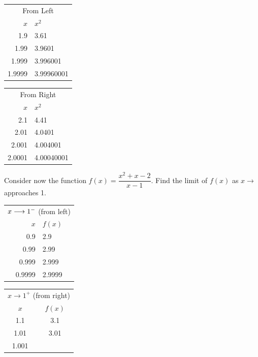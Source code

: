 \documentclass[11pt,a4paper]{article}
\begin{document}
\begin{table}[H]
\centering
\begin{tabular}{rl}
\multicolumn{2}{c}{From Left}\\
$x$ &  $x^2$\\
1.9 & 3.61\\
1.99 & 3.9601\\
1.999 & 3.996001\\
1.9999 & 3.99960001\\
\end{tabular}
\hspace{1.5cm}
\begin{tabular}{rl}
\multicolumn{2}{c}{From Right}\\
$x$ & $x^2$\\
2.1 & 4.41\\
2.01 & 4.0401\\
2.001 & 4.004001\\
2.0001 & 4.00040001\\
\end{tabular}
\end{table}


\vspace{.5cm}




Consider now the function $f(x)=\dfrac{x^2+x-2}{x-1}$. Find the limit of $f(x)$ as $x\longrightarrow $ approaches 1.\\

\begin{figure}[H]
\centering
{}
\end{figure}




\begin{table}[H]
\centering
\begin{tabular}{rl}
\multicolumn{2}{c}{$x\longrightarrow 1^{-}\hspace{0.1cm}$(from left)}\\
$x$ & $f(x)$\\
0.9 & 2.9\\
0.99 & 2.99\\
0.999 & 2.999\\
0.9999 & 2.9999\\
\end{tabular}
\hspace{2cm}
\begin{tabular}{cc}
\multicolumn{2}{c}{$x\longrightarrow 1^+$ (from right)}\\
$x$ & $f(x)$\\
1.1 & 3.1\\
1.01 & 3.01\\
1.001 & \\
\end{tabular}
\end{table}
\end{document}
